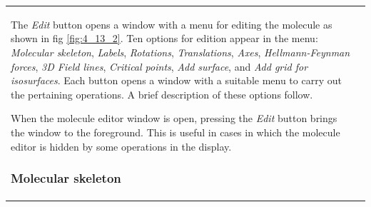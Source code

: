 \documentclass[10pt]{article}
\begin{document}

\begin{tabular}{lr}
\hspace*{-3mm}
\begin{minipage}{.5\linewidth}

The {\it Edit} button\index{3D graphics!edit molecule} opens a window with a menu for editing the molecule as
shown in fig \ref{fig:4_13_2}. Ten options for edition appear in the menu: 
{\it Molecular skeleton}, {\it Labels}, {\it Rotations},
{\it Translations}, {\it Axes}, {\it Hellmann-Feynman forces},  
{\it 3D Field lines}, {\it Critical points}, {\it Add surface}, and
{\it Add grid for isosurfaces}. Each button opens a window with a suitable menu to
carry out the pertaining operations. A brief description of these options follow.

When the molecule editor window is open, pressing the {\it Edit} button\index{3D graphics!show molecule editor} 
brings the window to the foreground. 
This is useful in cases in which the molecule editor is hidden by some operations in the display.

\subsubsection{Molecular skeleton \label{sec:4.13.1}\index{3D graphics!molecular skeleton}}


\end{minipage}
\end{tabular}
\end{document}
